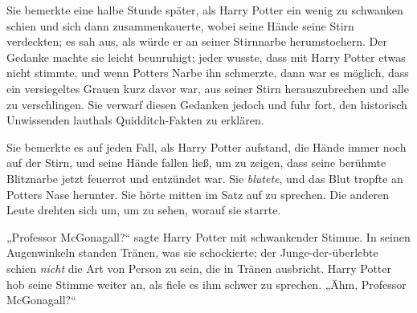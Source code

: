 Sie bemerkte eine halbe Stunde später, als Harry Potter ein wenig zu schwanken schien und sich dann zusammenkauerte, wobei seine Hände seine Stirn verdeckten; es sah aus, als würde er an seiner Stirnnarbe herumstochern. Der Gedanke machte sie leicht beunruhigt; jeder wusste, dass mit Harry Potter etwas nicht stimmte, und wenn Potters Narbe ihn schmerzte, dann war es möglich, dass ein versiegeltes Grauen kurz davor war, aus seiner Stirn herauszubrechen und alle zu verschlingen. Sie verwarf diesen Gedanken jedoch und fuhr fort, den historisch Unwissenden lauthals Quidditch-Fakten zu erklären.

Sie bemerkte es auf jeden Fall, als Harry Potter aufstand, die Hände immer noch auf der Stirn, und seine Hände fallen ließ, um zu zeigen, dass seine berühmte Blitznarbe jetzt feuerrot und entzündet war. Sie \emph{blutete}, und das Blut tropfte an Potters Nase herunter.
Sie hörte mitten im Satz auf zu sprechen.
Die anderen Leute drehten sich um, um zu sehen, worauf sie starrte.

„Professor McGonagall?“ sagte Harry Potter mit schwankender Stimme.
In seinen Augenwinkeln standen Tränen, was sie schockierte; der Junge-der-überlebte schien \emph{nicht} die Art von Person zu sein, die in Tränen ausbricht. Harry Potter hob seine Stimme weiter an, als fiele es ihm schwer zu sprechen.
„Ähm, Professor McGonagall?“

